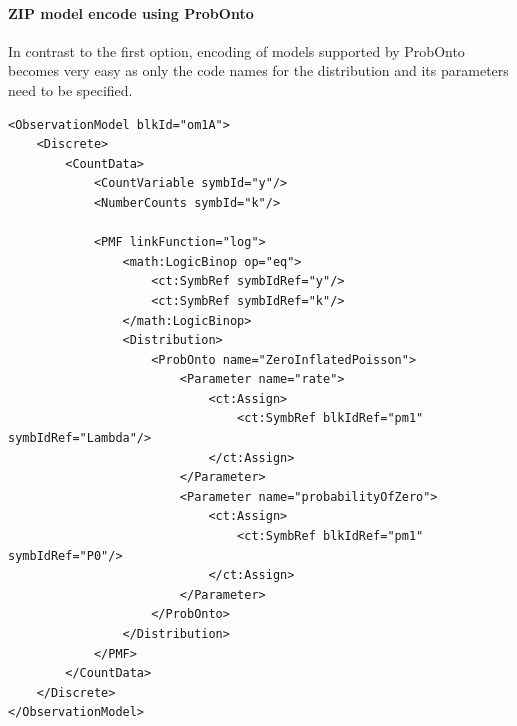 \paragraph{ZIP model encode using ProbOnto}
In contrast to the first option, encoding of models supported by ProbOnto
becomes very easy as only the code names for the distribution and its parameters 
need to be specified.

\lstset{language=XML}
\begin{lstlisting}
<ObservationModel blkId="om1A">
    <Discrete>
        <CountData>
            <CountVariable symbId="y"/>
            <NumberCounts symbId="k"/>
            
            <PMF linkFunction="log">
                <math:LogicBinop op="eq">
                    <ct:SymbRef symbIdRef="y"/>
                    <ct:SymbRef symbIdRef="k"/>
                </math:LogicBinop>
                <Distribution>
                    <ProbOnto name="ZeroInflatedPoisson">
                        <Parameter name="rate">
                            <ct:Assign>
                                <ct:SymbRef blkIdRef="pm1" symbIdRef="Lambda"/>
                            </ct:Assign>
                        </Parameter>
                        <Parameter name="probabilityOfZero">
                            <ct:Assign>
                                <ct:SymbRef blkIdRef="pm1" symbIdRef="P0"/>
                            </ct:Assign>
                        </Parameter>
                    </ProbOnto>
                </Distribution>
            </PMF>
        </CountData>
    </Discrete>
</ObservationModel>\end{lstlisting}

